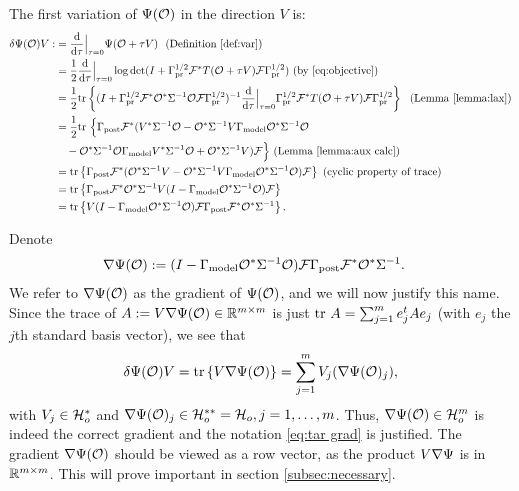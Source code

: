The first variation of $\Psi (\mathcal{O})$ in the direction $V$ is:
\begin{align}\label{eq:tar var}
  \begin{split}
    \delta \tar(\obs) V 
    :&= \frac{\der}{\der\tau} \Big |_{\tau=0} \tar(\obs + \tau V)\  \text{ (Definition \ref{def:var})}\\
    &= \frac12 \frac{\der}{\der \tau} \Big |_{\tau=0} \log \det 
    (I + \prcov^{1/2} \fwd^* T(\obs+\tau V)\fwd \prcov^{1/2} ) \text{ (by \eqref{eq:objective})}\\
    &= \frac12 \tr{( I + \prcov^{1/2} \fwd^* \obs^* \Sigma^{-1}
    \obs\fwd \prcov^{1/2} )^{-1}
    \frac{\der}{\der \tau} \Big |_{\tau=0}
    \prcov^{1/2} \fwd^* T(\obs+\tau V) \fwd \prcov^{1/2}}\ \text{ (Lemma \ref{lemma:lax})}\\
    &= \frac12 \ttr\Big \{ \postcov \fwd^* (V^* \Sigma^{-1} \obs 
    - \obs^*\Sigma^{-1} V\modcov \obs^* \Sigma^{-1}\obs \\
    &\ \ \ - \obs^* \Sigma^{-1} \obs \modcov V^* \Sigma^{-1}\obs 
    + \obs^* \Sigma^{-1} V ) \fwd \Big \}  \text{ (Lemma \ref{lemma:aux calc})}\\
    &= \tr{\postcov \fwd^* ( \obs^* \Sigma^{-1} V -
    \obs^*\Sigma^{-1} V\modcov \obs^* \Sigma^{-1}\obs ) \fwd} \text{
        (cyclic property of trace)} \\
    &= \tr{\postcov \fwd^* \obs^* \Sigma^{-1} V 
    ( I - \modcov \obs^* \Sigma^{-1}\obs ) \fwd} \\
    &= \tr{V ( I - \modcov \obs^* \Sigma^{-1}\obs )
    \fwd \postcov \fwd^* \obs^* \Sigma^{-1}}.
  \end{split}
\end{align} 

Denote
\begin{align}\label{eq:tar grad}
  \nabla \tar(\obs) &:= (I - \modcov \obs^* \Sigma^{-1} \obs) \fwd
  \postcov \fwd^* \obs^*\Sigma^{-1}.
\end{align}
We refer to $\nabla \Psi(\mathcal{O})$ as the gradient of $\Psi (\mathcal{O} )$, and
we will now justify this name. Since the trace of $A := V \nabla
\Psi(\mathcal{O}) \in \mathbb{R}^{m \times m}$ is just $\textup{tr}\ A = \sum_{j=1}^m e_j^t A
e_j$ (with $e_j$ the $j$th standard basis vector), we see that
\begin{align*}
  \delta \tar(\obs)V = \tr{V \nabla \tar(\obs)} = \sum_{j=1}^m
  V_j(\nabla \tar(\obs)_j),
\end{align*}
with $V_j \in \mathcal{H}_o^*$ and $\nabla \Psi(\mathcal{O})_j \in \mathcal{H}_o^{**} =
\mathcal{H}_o, j=1,\dots,m$. Thus, $\nabla \Psi( \mathcal{O} ) \in \mathcal{H}_o^m$ is indeed
the correct gradient and the notation \eqref{eq:tar grad} is
justified. The gradient $\nabla \Psi(\mathcal{O})$ should be viewed as a row
vector, as the product $V \nabla \Psi$ is in $\mathbb{R}^{m \times m}$. This
will prove important in section \ref{subsec:necessary}.

